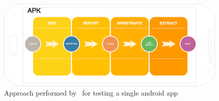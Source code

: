 \begin{figure}[tb]
\centering 
\includegraphics[width=\columnwidth]{imgs/apkprocess} 
\caption{Approach performed by \toolname\ for testing a single android app}
\label{fig: apkprocess}
\end{figure}






